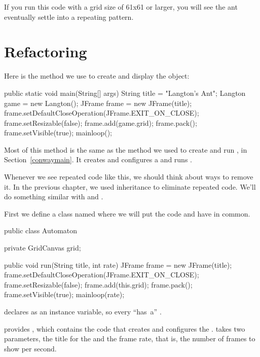 If you run this code with a grid size of 61x61 or larger, you will see the ant eventually settle into a repeating pattern.


\section{Refactoring}

Here is the  method we use to create and display the  object:

\begin{code}
public static void main(String[] args) {
    String title = "Langton's Ant";
    Langton game = new Langton();
    JFrame frame = new JFrame(title);
    frame.setDefaultCloseOperation(JFrame.EXIT_ON_CLOSE);
    frame.setResizable(false);
    frame.add(game.grid);
    frame.pack();
    frame.setVisible(true);
    mainloop();
}
\end{code}

Most of this method is the same as the  method we used to create and run , in Section~\ref{conwaymain}.
It creates and configures a  and runs .

Whenever we see repeated code like this, we should think about ways to remove it.
In the previous chapter, we used inheritance to eliminate repeated code.
We'll do something similar with  and .

First we define a class named  where we will put the code  and  have in common.

\begin{code}
public class Automaton {
	private GridCanvas grid;

    public void run(String title, int rate) {
        JFrame frame = new JFrame(title);
        frame.setDefaultCloseOperation(JFrame.EXIT_ON_CLOSE);
        frame.setResizable(false);
        frame.add(this.grid);
        frame.pack();
        frame.setVisible(true);
        mainloop(rate);
    }
}
\end{code}

 declares  as an instance variable, so every  ``has~a'' .

 provides , which contains the code that creates and configures the .
 takes two parameters, the title for the  and the frame rate, that is, the number of frames to show per second.

